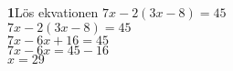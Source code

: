 \documentclass{article}
\begin{document}
\textbf{1}Lös ekvationen $7x-2(3x-8)=45$\\
$7x-2(3x-8)=45$\\
$7x-6x+16=45$\\
$7x-6x=45-16$\\
$x=29$
\end{document}
